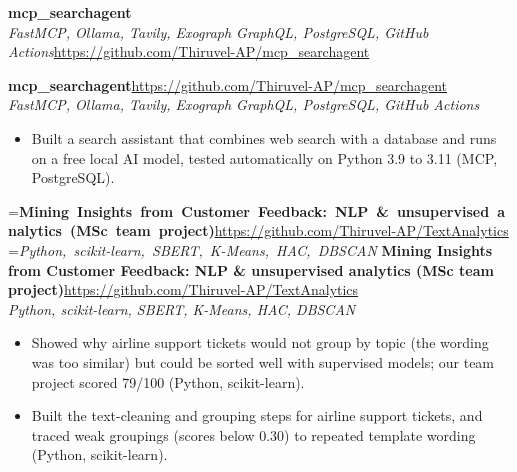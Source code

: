 \documentclass[a4paper,11pt]{article}
\newcommand{\project}[3]{%
  \textbf{#1}\hfill#3\\ {\color{muted}\small\textit{#2}}\par}
\newcommand{\gap}{\vspace{5pt}}
\begin{document}
\else
\textbf{mcp\_searchagent}\\ {\color{muted}\small\textit{FastMCP, Ollama, Tavily, Exograph GraphQL, PostgreSQL, GitHub Actions}}\hfill{\small\url{https://github.com/Thiruvel-AP/mcp_searchagent}}\par
\fi
\else
\project{mcp\_searchagent}{FastMCP, Ollama, Tavily, Exograph GraphQL, PostgreSQL, GitHub Actions}{\url{https://github.com/Thiruvel-AP/mcp_searchagent}}
\fi
\begin{itemize}
  \item Built a search assistant that combines web search with a database and runs on a free local AI model, tested automatically on Python 3.9 to 3.11 (MCP, PostgreSQL).
\end{itemize}
\gap
{}
=\hbox{\textbf{Mining Insights from Customer Feedback: NLP \& unsupervised analytics (MSc team project)}\hspace{1em}\url{https://github.com/Thiruvel-AP/TextAnalytics}}%
=\hbox{{\small\textit{Python, scikit-learn, SBERT, K-Means, HAC, DBSCAN}}}%
\ifdim\wd0>\linewidth
\ifdim\wd2>\linewidth
\textbf{Mining Insights from Customer Feedback: NLP \& unsupervised analytics (MSc team project)}\\ {\color{muted}\small\textit{Python, scikit-learn, SBERT, K-Means, HAC, DBSCAN}}\\ \hspace*{\fill}{\small\url{https://github.com/Thiruvel-AP/TextAnalytics}}\par
\else
\textbf{Mining Insights from Customer Feedback: NLP \& unsupervised analytics (MSc team project)}\\ {\color{muted}\small\textit{Python, scikit-learn, SBERT, K-Means, HAC, DBSCAN}}\hfill{\small\url{https://github.com/Thiruvel-AP/TextAnalytics}}\par
\fi
\else
\project{Mining Insights from Customer Feedback: NLP \& unsupervised analytics (MSc team project)}{Python, scikit-learn, SBERT, K-Means, HAC, DBSCAN}{\url{https://github.com/Thiruvel-AP/TextAnalytics}}
\fi
\begin{itemize}
  \item Showed why airline support tickets would not group by topic (the wording was too similar) but could be sorted well with supervised models; our team project scored 79/100 (Python, scikit-learn).
  \item Built the text-cleaning and grouping steps for airline support tickets, and traced weak groupings (scores below 0.30) to repeated template wording (Python, scikit-learn).
\end{itemize}
\end{document}
